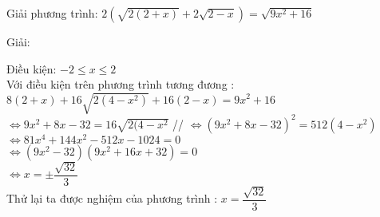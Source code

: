 \begin{vd}
  Giải phương trình: $ 2\left(\sqrt{2(2+x)}+2\sqrt{2-x}\right) = \sqrt{9x^2+16} $
\end{vd}
\begin{center}
    Giải:
\end{center}

Điều kiện: $ -2 \leq x \leq 2 $ \\
Với điều kiện trên phương trình tương đương : \\
$ 8(2+x) + 16\sqrt{2(4-x^2)} + 16(2-x) = 9x^2+16 $ \\
$ \Leftrightarrow 
    9x^2 +8x - 32 = 16 \sqrt{2(4-x^2}
$ //
$ \Leftrightarrow 
    (9x^2 +8x -32)^2 = 512(4 -x^2)
$\\
$\Leftrightarrow 
    81x^4 +144x^2 -512x -1024=0
$\\
$\Leftrightarrow 
    (9x^2-32)(9x^2 +16x+32)=0
    $\\
$\Leftrightarrow 
x=\pm \dfrac{\sqrt{32}}{3}
$\\
Thử lại ta được nghiệm của phương trình : $x=\dfrac{\sqrt{32}}{3}$
